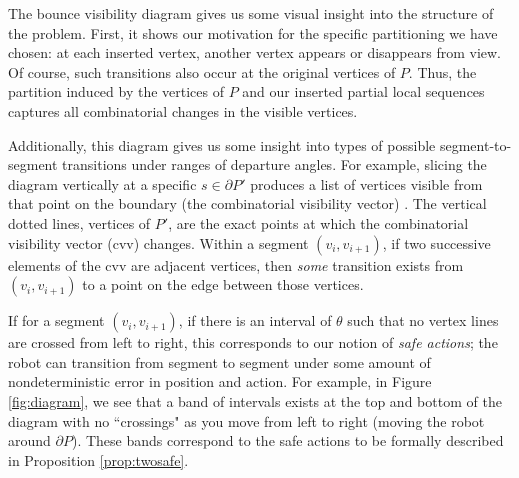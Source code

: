\documentclass[]{styles/svproc}  %
\begin{document}
The bounce visibility diagram gives us some visual insight into the structure of
the problem. First, it shows our motivation for the specific partitioning we
have chosen: at each inserted vertex, another vertex appears or disappears from view. Of course, such
transitions also occur at the original vertices of $P$. Thus, the partition induced by the
vertices of $P$ and our inserted partial local sequences captures all
combinatorial changes in the visible vertices.

Additionally, this diagram gives us some insight into types of possible
segment-to-segment transitions under ranges of departure angles. 
For example, slicing the diagram vertically at a specific $s \in \partial P'$
produces a list of vertices visible from that point on the boundary (the
combinatorial visibility vector) \cite{suri2008simple}. The vertical dotted
lines, vertices of $P'$, are the exact points at which the combinatorial visibility
vector (cvv) changes. Within a segment $(v_i, v_{i+1})$, if two successive elements of the cvv are 
adjacent vertices, then \emph{some} transition exists from
$(v_i, v_{i+1})$ to a point on the edge between those vertices.

If for a segment $(v_i, v_{i+1})$, if there is an interval of $\theta$ such that
no vertex lines are crossed from left to right, this corresponds to our notion
of \emph{safe actions}; the robot can transition from segment to segment under
some amount of nondeterministic error in position and action.
For example, in
Figure \ref{fig:diagram}, we see that a band of intervals exists at the top and
bottom of the diagram with no ``crossings" as you move from left to right
(moving the robot around $\partial P$). These bands correspond to the safe
actions to be formally described in Proposition \ref{prop:twosafe}.

%
\end{document}
